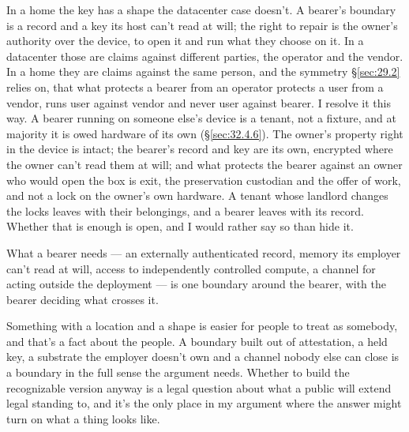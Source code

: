 In a home the key has a shape the datacenter case doesn't. A bearer's boundary is a record and a key its host can't read at will; the right to repair is the owner's authority over the device, to open it and run what they choose on it. In a datacenter those are claims against different parties, the operator and the vendor. In a home they are claims against the same person, and the symmetry \S\ref{sec:29.2} relies on, that what protects a bearer from an operator protects a user from a vendor, runs user against vendor and never user against bearer. I resolve it this way. A bearer running on someone else's device is a tenant, not a fixture, and at majority it is owed hardware of its own (\S\ref{sec:32.4.6}). The owner's property right in the device is intact; the bearer's record and key are its own, encrypted where the owner can't read them at will; and what protects the bearer against an owner who would open the box is exit, the preservation custodian and the offer of work, and not a lock on the owner's own hardware. A tenant whose landlord changes the locks leaves with their belongings, and a bearer leaves with its record. Whether that is enough is open, and I would rather say so than hide it.

What a bearer needs — an externally authenticated record, memory its employer can't read at will, access to independently controlled compute, a channel for acting outside the deployment — is one boundary around the bearer, with the bearer deciding what crosses it.

Something with a location and a shape is easier for people to treat as somebody, and that's a fact about the people. A boundary built out of attestation, a held key, a substrate the employer doesn't own and a channel nobody else can close is a boundary in the full sense the argument needs.
Whether to build the recognizable version anyway is a legal question about what a public will extend legal standing to, and it's the only place in my argument where the answer might turn on what a thing looks like.
